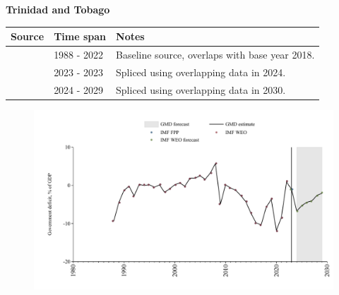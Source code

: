 \documentclass[12pt,a4paper,landscape]{article}
\begin{document}
\begin{adjustbox}{max totalsize={\paperwidth}{\paperheight},center}
\begin{minipage}[t][\textheight][t]{\textwidth}
\vspace*{0.5cm}
{}
\begin{center}
{\Large\bfseries Trinidad and Tobago}
\end{center}
\vspace{0.5cm}
\begin{table}[H]
\centering
\small
\begin{tabular}{|l|l|l|}
\hline
\textbf{Source} & \textbf{Time span} & \textbf{Notes} \\
\hline
\rowcolor{white}\cite{IMF_WEO}& 1988 - 2022 &Baseline source, overlaps with base year 2018.\\
\rowcolor{lightgray}\cite{IMF_FPP}& 2023 - 2023 &Spliced using overlapping data in 2024.\\
\rowcolor{white}\cite{IMF_WEO_forecast}& 2024 - 2029 &Spliced using overlapping data in 2030.\\
\hline
\end{tabular}
\end{table}
\begin{figure}[H]
\centering
\includegraphics[width=\textwidth,height=0.6\textheight,keepaspectratio]{graphs/TTO_govdef_GDP.pdf}
\end{figure}
\end{minipage}
\end{adjustbox}
\end{document}
